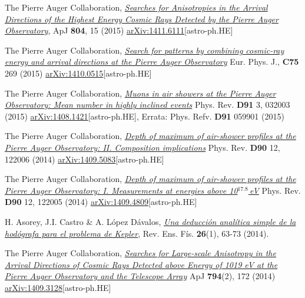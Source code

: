 \begin{etaremune}
\item {}The Pierre Auger Collaboration, \href{http://dx.doi.org/}{\emph{Searches for Anisotropies in the Arrival Directions of the Highest Energy Cosmic Rays Detected by the Pierre Auger Observatory}}, ApJ {\bf{804}}, 15 (2015) \href{http://arxiv.org/abs/1411.6111}{arXiv:1411.6111}[astro-ph.HE]

\item {}The Pierre Auger Collaboration, \href{http://dx.doi.org/}{\emph{Search for patterns by combining cosmic-ray energy and arrival directions at the Pierre Auger Observatory}} Eur. Phys. J., {\bf{C75}} 269 (2015) \href{http://arxiv.org/abs/1410.0515}{arXiv:1410.0515}[astro-ph.HE]

\item {}The Pierre Auger Collaboration, \href{http://dx.doi.org/10.1103/PhysRevD.91.032003}{\emph{Muons in air showers at the Pierre Auger Observatory: Mean number in highly inclined events}} Phys. Rev. {\bf{D91}} 3, 032003 (2015) \href{http://arxiv.org/abs/1408.1421}{arXiv:1408.1421}[astro-ph.HE], Errata: Phys. Refv. {\bf{D91}} 059901 (2015)

\item {}The Pierre Auger Collaboration, \href{http://dx.doi.org/10.1103/PhysRevD.90.122006}{\emph{Depth of maximum of air-shower profiles at the Pierre Auger Observatory: II. Composition implications}} Phys. Rev. {\bf{D90}} 12, 122006 (2014) \href{http://arxiv.org/abs/1409.5083}{arXiv:1409.5083}[astro-ph.HE]

\item {}The Pierre Auger Collaboration, \href{http://dx.doi.org/10.1103/PhysRevD.90.122005}{\emph{Depth of maximum of air-shower profiles at the Pierre Auger Observatory: I. Measurements at energies above 10$^{17.8}$\,eV}} Phys. Rev. {\bf{D90}} 12, 122005 (2014) \href{http://arxiv.org/abs/1409.4809}{arXiv:1409.4809}[astro-ph.HE]

\item {}H. Asorey, J.I. Castro \& A. López Dávalos, \href{http://www.revistas.unc.edu.ar/index.php/revistaEF/article/view/9512}{\emph{Una deducción analítica simple de la hodógrafa para el problema de Kepler}}, Rev. Ens. Fís. {\bf{26}}(1), 63-73 (2014).

\item {}The Pierre Auger Collaboration, \href{http://dx.doi.org/10.1088/0004-637X/794/2/172}{\emph{Searches for Large-scale Anisotropy in the Arrival Directions of Cosmic Rays Detected above Energy of 1019 eV at the Pierre Auger Observatory and the Telescope Array}} ApJ {\bf{794}}(2), 172 (2014) \href{http://arxiv.org/abs/1409.3128}{arXiv:1409.3128}[astro-ph.HE]


\end{etaremune}
